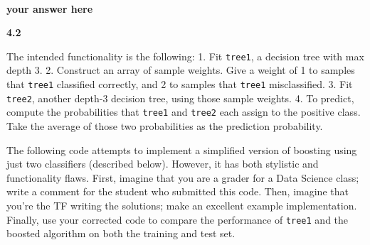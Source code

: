 \documentclass[11pt]{article}
\begin{document}
    \begin{center}
    \end{center}
    { \hspace*{\fill} \\}
    
    \textbf{your answer here}

    \textbf{4.2}

    The intended functionality is the following: 1. Fit \texttt{tree1}, a
decision tree with max depth 3. 2. Construct an array of sample weights.
Give a weight of 1 to samples that \texttt{tree1} classified correctly,
and 2 to samples that \texttt{tree1} misclassified. 3. Fit
\texttt{tree2}, another depth-3 decision tree, using those sample
weights. 4. To predict, compute the probabilities that \texttt{tree1}
and \texttt{tree2} each assign to the positive class. Take the average
of those two probabilities as the prediction probability.

The following code attempts to implement a simplified version of
boosting using just two classifiers (described below). However, it has
both stylistic and functionality flaws. First, imagine that you are a
grader for a Data Science class; write a comment for the student who
submitted this code. Then, imagine that you're the TF writing the
solutions; make an excellent example implementation. Finally, use your
corrected code to compare the performance of \texttt{tree1} and the
boosted algorithm on both the training and test set.
\end{document}
